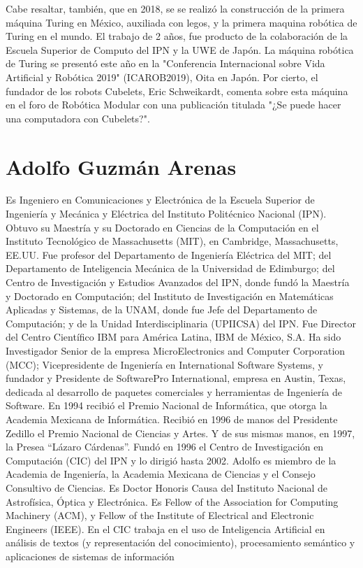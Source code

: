\documentclass[notitlepage,letterpaper, 11pt]{article}
\begin{document}
\noindent Cabe resaltar, también, que en 2018, se se realizó la construcción de la primera máquina Turing en México, auxiliada con legos, y la primera maquina robótica de Turing en el mundo. El trabajo de 2 años, fue producto de la colaboración de la Escuela Superior de Computo del IPN y la UWE de Japón.
La máquina robótica de Turing se presentó este año en la "Conferencia Internacional sobre Vida Artificial y Robótica 2019" (ICAROB2019), Oita en Japón. Por cierto, el fundador de los robots Cubelets, Eric Schweikardt, comenta sobre esta máquina en el foro de Robótica Modular con una publicación titulada "¿Se puede hacer una computadora con Cubelets?".

\newpage
\section*{Adolfo Guzmán Arenas}
Es Ingeniero en Comunicaciones y Electrónica de la Escuela Superior de Ingeniería y Mecánica y Eléctrica del Instituto Politécnico Nacional (IPN). Obtuvo su Maestría y su Doctorado en Ciencias de la Computación en el Instituto Tecnológico de Massachusetts (MIT), en Cambridge, Massachusetts, EE.UU. Fue profesor del Departamento de Ingeniería Eléctrica del MIT; del Departamento de Inteligencia Mecánica de la Universidad de Edimburgo; del Centro de Investigación y Estudios Avanzados del IPN, donde fundó la Maestría y Doctorado en Computación; del Instituto de Investigación en Matemáticas Aplicadas y Sistemas, de la UNAM, donde fue Jefe del Departamento de Computación; y de la Unidad Interdisciplinaria (UPIICSA) del IPN. Fue Director del Centro Científico IBM para América Latina, IBM de México, S.A. Ha sido Investigador Senior de la empresa MicroElectronics and Computer Corporation (MCC); Vicepresidente de Ingeniería en International Software Systems, y fundador y Presidente de SoftwarePro International, empresa en Austin, Texas, dedicada al desarrollo de paquetes comerciales y herramientas de Ingeniería de Software. En 1994 recibió el Premio Nacional de Informática, que otorga la Academia Mexicana de Informática. Recibió en 1996 de manos del Presidente Zedillo el Premio Nacional de Ciencias y Artes. Y de sus mismas manos, en 1997, la Presea “Lázaro Cárdenas”. Fundó en 1996 el Centro de Investigación en Computación (CIC) del IPN y lo dirigió hasta 2002. Adolfo es miembro de la Academia de Ingeniería, la Academia Mexicana de Ciencias y el Consejo Consultivo de Ciencias. Es Doctor Honoris Causa del Instituto Nacional de Astrofísica, Óptica y Electrónica. Es Fellow of the Association for Computing Machinery (ACM), y Fellow of the Institute of Electrical and Electronic Engineers (IEEE). En el CIC trabaja en el uso de Inteligencia Artificial en análisis de textos (y representación del conocimiento), procesamiento semántico y aplicaciones de sistemas de información
\end{document}
